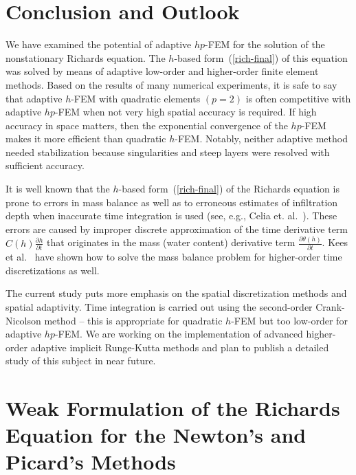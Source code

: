 \documentclass[final,3p,times,twocolumn]{elsarticle}
\begin{document}
\section{Conclusion and Outlook} \label{sec:8}

We have examined the potential of adaptive $hp$-FEM
for the solution of the nonstationary Richards equation. 
The $h$-based form~(\ref{rich-final}) of this equation 
was solved by means of adaptive low-order 
and higher-order finite element methods. 
Based on the results of many numerical experiments, 
it is safe to say that adaptive $h$-FEM with quadratic elements $(p=2)$
is often competitive with adaptive $hp$-FEM when not very high spatial 
accuracy is required. If high accuracy in space matters, then 
the exponential convergence of the $hp$-FEM makes it more 
efficient than quadratic $h$-FEM. Notably, neither adaptive
method needed stabilization because singularities and steep
layers were resolved with sufficient accuracy.



It is well known that the $h$-based form~(\ref{rich-final}) 
of the Richards equation is prone 
to errors in mass balance as well as to erroneous estimates of 
infiltration depth when inaccurate time integration is used (see, e.g., 
Celia et. al.~\cite{celia}). These errors are caused by improper discrete 
approximation of the time derivative term 
$C(h)\frac{\partial h}{\partial t}$ that originates in the mass (water content) derivative 
term $\frac{\partial \theta(h)}{\partial t}$. Kees et al.~\cite{kees-time-integ} have 
shown how to solve the mass balance problem for higher-order time discretizations as well.

The current study puts more emphasis on the spatial discretization methods 
and spatial adaptivity. Time integration is carried out using the 
second-order Crank-Nicolson method -- this is appropriate for quadratic $h$-FEM
but too low-order for adaptive $hp$-FEM. We are working on the implementation 
of advanced higher-order adaptive implicit Runge-Kutta methods and plan to 
publish a detailed study of this subject in near future.



\appendix


\section{Weak Formulation of the Richards Equation
for the Newton's and Picard's Methods}\label{sec:9}
\end{document}
